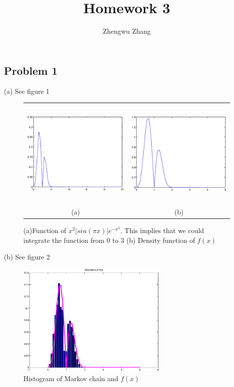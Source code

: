 \documentclass[12pt] {article}
\author{Zhengwu Zhang}
\title{Homework 3}
\begin{document}
 
\maketitle
\newpage
\subsection{Problem 1}
(a) See figure 1
\begin{figure}
\begin{center}
\begin{tabular}{cc}
\includegraphics[height=2.1in]{prob1f0.eps}&
\includegraphics[height=2.1in]{prob1f.eps}\\
(a) & (b)
\end{tabular}
\caption{(a)Function of $x^2|sin(\pi x)|e^{-x^3}$. This implies that we could integrate the function from 0 to 3 (b) Density function of $f(x)$}
\end{center}
\end{figure}

(b) See figure 2
\begin{figure}
\begin{center}
\includegraphics[height=2.2in]{prob1hist.eps}
\caption{Histogram of Markov chain and $f(x)$}
\end{center}
\end{figure}
\end{document}
